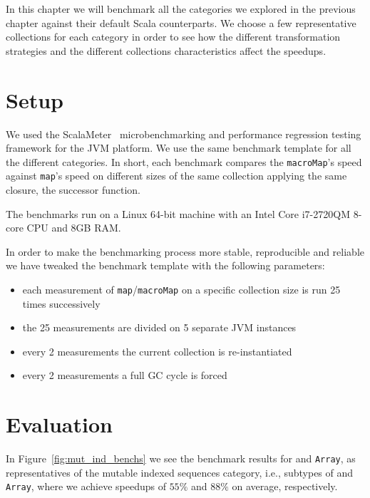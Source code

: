 \label{benchmarks}

In this chapter we will benchmark all the categories we explored in
the previous chapter against their default Scala counterparts. We choose a few
representative collections for each category in order to see how the different
transformation strategies and the different collections characteristics affect
the speedups.

\section{Setup}

We used the ScalaMeter~\cite{axel22:scalameter} microbenchmarking and performance regression
testing framework for the JVM platform. We use the same benchmark template for
all the different categories. In short, each benchmark compares the \texttt{macroMap}'s speed against \texttt{map}'s speed
on different sizes of the same collection applying the same closure, the
successor function.

The benchmarks run on a Linux 64-bit machine with an Intel Core i7-2720QM 8-core
CPU and 8GB RAM.

In order to make the benchmarking process more stable, reproducible and reliable
we have tweaked the benchmark template with the following parameters:

\begin{itemize}
 \item 
  each measurement of \texttt{map}/\texttt{macroMap} on a specific collection size is run 25
times successively
 \item
  the 25 measurements are divided on 5 separate JVM instances
 \item
  every 2 measurements the current collection is re-instantiated
 \item
  every 2 measurements a full GC cycle is forced
\end{itemize}


\section{Evaluation}

In Figure~\ref{fig:mut_ind_benchs} we see the benchmark results for  
and \texttt{Array}, as representatives of the mutable indexed
sequences category, i.e., subtypes of  and
\texttt{Array}, where we achieve speedups of $55\%$ and $88\%$ on average, respectively.

